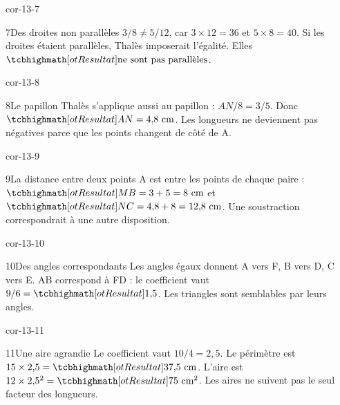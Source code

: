 \begin{blocLivre}{cor-13-7}\begin{corrige}{7}{Des droites non parallèles}
$3/8\ne5/12$, car $3\times12=36$ et $5\times8=40$. Si les droites étaient parallèles, Thalès imposerait l’égalité. Elles $\res{\text{ne sont pas parallèles}}$.
\label{fig-cor-13-7}
\end{corrige}\end{blocLivre}
\begin{blocLivre}{cor-13-8}\begin{corrige}{8}{Le papillon}
Thalès s’applique aussi au papillon : $AN/8=3/5$. Donc $\res{AN=4{,}8\text{ cm}}$. Les longueurs ne deviennent pas négatives parce que les points changent de côté de A.
\label{fig-cor-13-8}
\end{corrige}\end{blocLivre}
\begin{blocLivre}{cor-13-9}\begin{corrige}{9}{La distance entre deux points}
A est entre les points de chaque paire : $\res{MB=3+5=8\text{ cm}}$ et $\res{NC=4{,}8+8=12{,}8\text{ cm}}$. Une soustraction correspondrait à une autre disposition.
\label{fig-cor-13-9}
\end{corrige}\end{blocLivre}
\begin{blocLivre}{cor-13-10}\begin{corrige}{10}{Des angles correspondants}
Les angles égaux donnent A vers F, B vers D, C vers E. AB correspond à FD : le coefficient vaut $9/6=\res{1{,}5}$. Les triangles sont semblables par leurs angles.
\label{fig-cor-13-10}
\end{corrige}\end{blocLivre}
\begin{blocLivre}{cor-13-11}\begin{corrige}{11}{Une aire agrandie}
Le coefficient vaut $10/4=2{,}5$. Le périmètre est $15\times2{,}5=\res{37{,}5\text{ cm}}$. L’aire est $12\times2{,}5^2=\res{75\text{ cm}^2}$. Les aires ne suivent pas le seul facteur des longueurs.
\label{fig-cor-13-11}
\end{corrige}\end{blocLivre}

